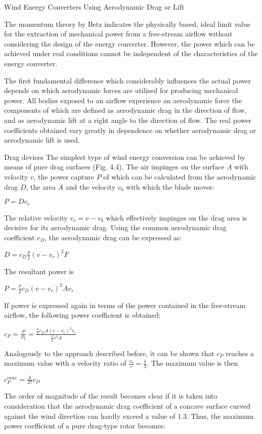 Wind Energy Converters Using Aerodynamic Drag or Lift

The momentum theory by Betz indicates the physically based, ideal limit value for the extraction of mechanical power from a free-stream airflow without considering the design of the energy converter. However, the power which can be achieved under real conditions cannot be independent of the characteristics of the energy converter.

The first fundamental difference which considerably influences the actual power depends on which aerodynamic forces are utilised for producing mechanical power. All bodies exposed to an airflow experience an aerodynamic force the components of which are defined as aerodynamic drag in the direction of flow, and as aerodynamic lift at a right angle to the direction of flow. The real power coefficients obtained vary greatly in dependence
on whether aerodynamic drag or aerodynamic lift is used.

Drag devices
The simplest type of wind energy conversion can be achieved by means of pure drag surfaces (Fig. 4.4). The air impinges on the surface $A$ with velocity $v$, the power capture $P$ of which can be calculated from the aerodynamic drag $D$, the area $A$ and the velocity $v_b$ with which the blade moves:

$P = D v_r$

The relative velocity $v_r = v − v_b$ which effectively impinges on the drag area is decisive for its aerodynamic drag. Using the common aerodynamic drag coefficient $c_D$, the aerodynamic drag can be expressed as:

$D = c_D \frac{\rho}{2} (v -v_r)^2 F$

The resultant power is

$P = \frac{\rho}{2}c_D (v -v_r)^2 A v_r$

If power is expressed again in terms of the power contained in the free-stream airflow, the following power coefficient is obtained:

$c_P = \frac{P}{P_0} = \frac{\frac{\rho}{2} c_D A (v-v_r)^2 v_r}{\frac{\rho}{2} v^3 A}$

Analogously to the approach described before, it can be shown that $c_P$ reaches a maximum value with a velocity ratio of $\frac{v_b}{v} = \frac{1}{3}$. The maximum value is then

$c_{P}^{max} = \frac{4}{27}c_D$

The order of magnitude of the result becomes clear if it is taken into consideration that the aerodynamic drag coefficient of a concave surface curved against the wind direction can hardly exceed a value of 1.3. Thus, the maximum power coefficient of a pure drag-type rotor becomes:

